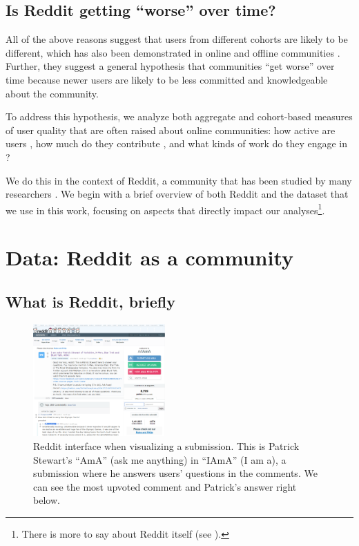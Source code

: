 \subsection{Is Reddit getting ``worse'' over time?}
All of the above reasons suggest that users from different cohorts are likely to be different, which has also been demonstrated in online and offline communities \cite{Ryder1965,Danescu-niculescu-mizil2013,Prensky2001,Correa2010}.  Further, they suggest a general hypothesis that communities ``get worse'' over time because newer users are likely to be less committed and knowledgeable about the community. 

To address this hypothesis, we analyze both aggregate and cohort-based measures of user quality that are often raised about online communities: how active are users \cite{Scellato2011,Hughes2009,Java2007,Levy1984}, how much do they contribute \cite{Scellato2011,Gruhl2004,Guo2009}, and what kinds of work do they engage in \cite{Welser2011,Choi2010,Panciera2009}?  

We do this in the context of Reddit, a community that has been studied by many researchers \cite{Gilbert2013,Stoddard2015,Bergstrom2011,Tan2015}. We begin with a brief overview of both Reddit and the dataset that we use in this work, focusing on aspects that directly impact our analyses\footnote{There is more to say about Reddit itself (see \cite{AboutReddit}).}.

\section{Data: Reddit as a community}


\subsection{What is Reddit, briefly}

\begin{figure}[!tb]
\centering
\includegraphics[width=0.45\textwidth,natwidth=964,natheight=823]{./images/reddit.png}
\caption{Reddit interface when visualizing a submission. This is Patrick Stewart's ``AmA'' (ask me anything) in ``IAmA'' (I am a), a submission where he answers users' questions in the comments. We can see the most upvoted comment and Patrick's answer right below.}
\label{fig:reddit}
\end{figure}

